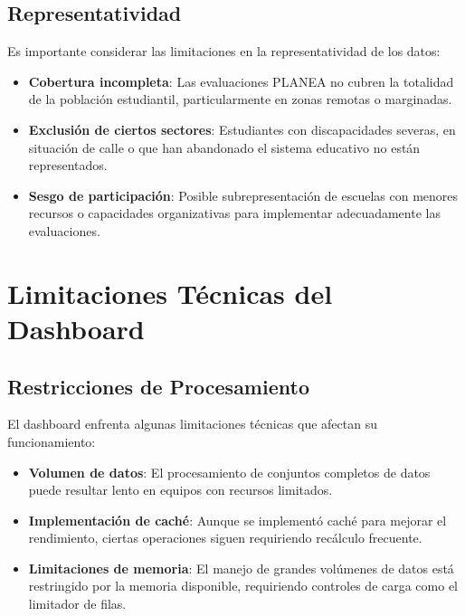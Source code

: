 \subsection{Representatividad}
Es importante considerar las limitaciones en la representatividad de los datos:

\begin{itemize}
    \item \textbf{Cobertura incompleta}: Las evaluaciones PLANEA no cubren la totalidad de la población estudiantil, particularmente en zonas remotas o marginadas.
    
    \item \textbf{Exclusión de ciertos sectores}: Estudiantes con discapacidades severas, en situación de calle o que han abandonado el sistema educativo no están representados.
    
    \item \textbf{Sesgo de participación}: Posible subrepresentación de escuelas con menores recursos o capacidades organizativas para implementar adecuadamente las evaluaciones.
\end{itemize}

\section{Limitaciones Técnicas del Dashboard}

\subsection{Restricciones de Procesamiento}
El dashboard enfrenta algunas limitaciones técnicas que afectan su funcionamiento:

\begin{itemize}
    \item \textbf{Volumen de datos}: El procesamiento de conjuntos completos de datos puede resultar lento en equipos con recursos limitados.
    
    \item \textbf{Implementación de caché}: Aunque se implementó caché para mejorar el rendimiento, ciertas operaciones siguen requiriendo recálculo frecuente.
    
    \item \textbf{Limitaciones de memoria}: El manejo de grandes volúmenes de datos está restringido por la memoria disponible, requiriendo controles de carga como el limitador de filas.
\end{itemize}

